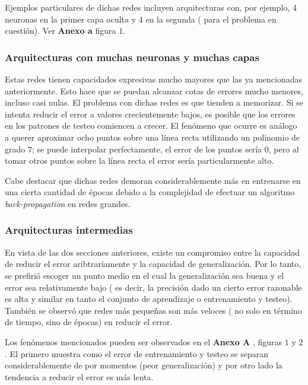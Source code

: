 \documentclass[%
    final,
    reprint,
    notitlepage,
    narroweqnarray,
    inline,
    twoside,
    invited
    ]{ieee}
\begin{document}
\par Ejemplos particulares de dichas redes incluyen arquitecturas con, por ejemplo, 4 neuronas en la primer capa oculta y 4
en la segunda ( para el problema en cuestión). Ver \textbf{Anexo a} figura $1$.

\subsubsection{Arquitecturas con muchas neuronas y muchas capas}

\par Estas redes tienen capacidades expresivas mucho mayores que las ya mencionadas anteriormente. Esto hace que se puedan 
alcanzar cotas de errores mucho menores, incluso casi nulas. El problema con dichas redes es que tienden a memorizar. Si 
se intenta reducir el error a valores crecientemente bajos, es posible que los errores en los patrones de testeo comiencen 
a crecer. El fenómeno que ocurre es análogo a querer aproximar ocho puntos sobre una línea recta utilizando un polinomio 
de grado $7$; se puede interpolar perfectamente, el error de los puntos sería $0$, pero al tomar otros puntos sobre 
la línea recta el error sería particularmente alto.

\par Cabe destacar que dichas redes demoran considerablemente más en entrenarse en 
una cierta cantidad de épocas debido 
a la complejidad de efectuar un algoritmo \textit{back-propagation} en redes grandes. 

\subsubsection{Arquitecturas intermedias}

\par En vista de las dos secciones anteriores, existe un compromiso entre la capacidad de reducir el error aribtrariamente 
y la capacidad de generalización. Por lo tanto, se prefirió escoger un punto medio en el cual la generalización sea buena y 
el error sea relativamente bajo ( es decir, la precisión dado un cierto error razonable es alta y similar en tanto 
el conjunto de aprendizaje o entrenamiento y testeo). También se observó que redes más pequeñas son más veloces ( 
no solo en término de tiempo, sino de épocas) en reducir el error.

\par Los fenómenos mencionados pueden ser observados en el \textbf{Anexo A} , figuras $1$ y $2$. El primero 
muestra como el error de entrenamiento y testeo se separan considerablemente de por momentos (peor generalización) y 
por otro lado la tendencia a reducir el error es más lenta.
\end{document}
